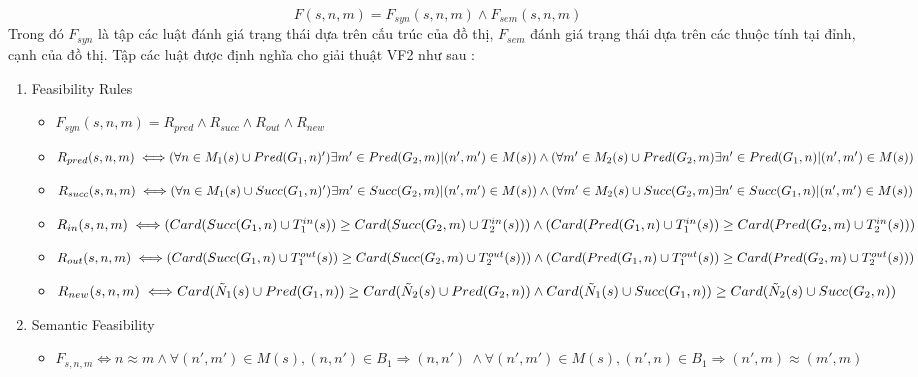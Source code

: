 \documentclass[12pt]{report}
\begin{document}
\indent \indent \indent \indent \indent
\begin{equation}
	F(s,n,m) = F_{syn}(s,n,m) \wedge F_{sem}(s,n,m)
\end{equation}
Trong đó $F_{syn}$ là tập các luật đánh giá trạng thái dựa trên cấu trúc của đồ thị, $F_{sem}$ đánh giá trạng thái dựa trên các thuộc tính tại đỉnh, cạnh của đồ thị.
\noindent Tập các luật được định nghĩa cho giải thuật VF2 như sau \cite{vf2_1368}:
\begin{enumerate}
	\item Feasibility Rules 
	\begin{itemize}
		\item $F_{syn}(s,n,m) = R_{pred} \wedge R_{succ} \wedge R_{out} \wedge R_{new}$
		\item $R_{pred}(s,n,m) \iff\\ (\forall n \in M_1(s) \cup Pred(G_1,n)') \exists m' \in Pred(G_2,m) | (n',m') \in M(s)) \wedge\\
		(\forall m' \in M_2(s) \cup Pred(G_2,m) \exists n' \in Pred(G_1,n) | (n',m') \in M(s))$
		\item $R_{succ}(s,n,m) \iff\\ (\forall n \in M_1(s) \cup Succ(G_1,n)') \exists m' \in Succ(G_2,m) | (n',m') \in M(s)) \wedge\\ 
		(\forall m' \in M_2(s) \cup Succ(G_2,m) \exists n' \in Succ(G_1,n) | (n',m') \in M(s))$
		\item $R_{in}(s,n,m) \iff\\ (Card(Succ(G_1,n) \cup T^{in}_1(s)) \geq  Card(Succ(G_2,m) \cup T^{in}_2(s))) \wedge\\
		(Card(Pred(G_1,n)\cup T^{in}_1(s)) \geq Card(Pred(G_2,m)\cup T^{in}_2(s)))$ 
		\item $R_{out}(s,n,m) \iff\\ (Card(Succ(G_1,n) \cup T^{out}_1(s)) \geq  Card(Succ(G_2,m) \cup T^{out}_2(s))) \wedge\\
		(Card(Pred(G_1,n)\cup T^{out}_1(s)) \geq Card(Pred(G_2,m)\cup T^{out}_2(s)))$ 
		\item $R_{new}(s,n,m) \iff\\ Card(\tilde{N}_1(s) \cup Pred(G_1,n)) \geq Card(\tilde{N}_2(s) \cup Pred(G_2,n)) \wedge\\
		Card(\tilde{N}_1(s) \cup Succ(G_1,n)) \geq Card(\tilde{N}_2(s) \cup Succ(G_2,n))$
	\end{itemize}
	\item Semantic Feasibility
	\begin{itemize}
		\item $F_{s,n,m} \iff n \approx m  \wedge \forall(n',m') \in M(s),(n,n') \in B_1 \Rightarrow (n,n')\
		 \wedge \forall(n',m') \in M(s),(n',n) \in B_1 \Rightarrow (n',m) \approx (m',m)$
	\end{itemize} 
\end{enumerate}
\end{document}
